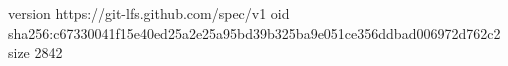 version https://git-lfs.github.com/spec/v1
oid sha256:c67330041f15e40ed25a2e25a95bd39b325ba9e051ce356ddbad006972d762c2
size 2842
